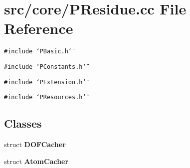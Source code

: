 \section{src/core/PResidue.cc File Reference}
\label{PResidue_8cc}


{\tt \#include \char`\"{}PBasic.h\char`\"{}}\par
{\tt \#include \char`\"{}PConstants.h\char`\"{}}\par
{\tt \#include \char`\"{}PExtension.h\char`\"{}}\par
{\tt \#include \char`\"{}PResources.h\char`\"{}}\par
\subsection*{Classes}
\begin{CompactItemize}
\item 
struct {\bf DOFCacher}
\item 
struct {\bf Atom\-Cacher}
\end{CompactItemize}
